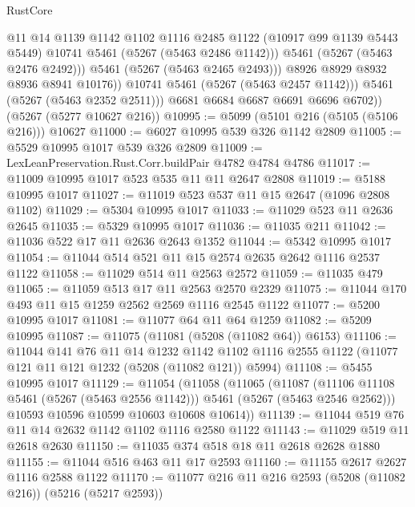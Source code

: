 \begin{lexlean}{RustCore}
\begin{coremodule}
                      @11
                      @14
                      @1139
                      @1142
                      @1102
                      @1116
                      @2485
                      @1122
                      (@10917 @99 @1139 @5443 @5449)
                      @10741
                      @5461
                      (@5267 (@5463 @2486 @1142)))
                    @5461
                    (@5267 (@5463 @2476 @2492)))
                  @5461
                  (@5267 (@5463 @2465 @2493)))
                @8926
                @8929
                @8932
                @8936
                @8941
                @10176))
            @10741
            @5461
            (@5267 (@5463 @2457 @1142)))
          @5461
          (@5267 (@5463 @2352 @2511)))
        @6681
        @6684
        @6687
        @6691
        @6696
        @6702))
    (@5267 (@5277 @10627 @216))
@10995 := @5099 (@5101 @216 (@5105 (@5106 @216))) @10627
@11000 := @6027 @10995 @539 @326 @1142 @2809
@11005 := @5529 @10995 @1017 @539 @326 @2809
@11009 := LexLeanPreservation.Rust.Corr.buildPair @4782 @4784 @4786
@11017 := @11009 @10995 @1017 @523 @535 @11 @11 @2647 @2808
@11019 := @5188 @10995 @1017
@11027 := @11019 @523 @537 @11 @15 @2647 (@1096 @2808 @1102)
@11029 := @5304 @10995 @1017
@11033 := @11029 @523 @11 @2636 @2645
@11035 := @5329 @10995 @1017
@11036 := @11035 @211
@11042 := @11036 @522 @17 @11 @2636 @2643 @1352
@11044 := @5342 @10995 @1017
@11054 := @11044 @514 @521 @11 @15 @2574 @2635 @2642 @1116 @2537 @1122
@11058 := @11029 @514 @11 @2563 @2572
@11059 := @11035 @479
@11065 := @11059 @513 @17 @11 @2563 @2570 @2329
@11075 := @11044 @170 @493 @11 @15 @1259 @2562 @2569 @1116 @2545 @1122
@11077 := @5200 @10995 @1017
@11081 := @11077 @64 @11 @64 @1259
@11082 := @5209 @10995
@11087 := @11075 (@11081 (@5208 (@11082 @64)) @6153)
@11106 := @11044
    @141
    @76
    @11
    @14
    @1232
    @1142
    @1102
    @1116
    @2555
    @1122
    (@11077 @121 @11 @121 @1232 (@5208 (@11082 @121)) @5994)
@11108 := @5455 @10995 @1017
@11129 := @11054
    (@11058
      (@11065
        (@11087 (@11106 @11108 @5461 (@5267 (@5463 @2556 @1142))) @5461 (@5267 (@5463 @2546 @2562)))
        @10593
        @10596
        @10599
        @10603
        @10608
        @10614))
@11139 := @11044 @519 @76 @11 @14 @2632 @1142 @1102 @1116 @2580 @1122
@11143 := @11029 @519 @11 @2618 @2630
@11150 := @11035 @374 @518 @18 @11 @2618 @2628 @1880
@11155 := @11044 @516 @463 @11 @17 @2593
@11160 := @11155 @2617 @2627 @1116 @2588 @1122
@11170 := @11077 @216 @11 @216 @2593 (@5208 (@11082 @216)) (@5216 (@5217 @2593))

\end{coremodule}
\end{lexlean}
